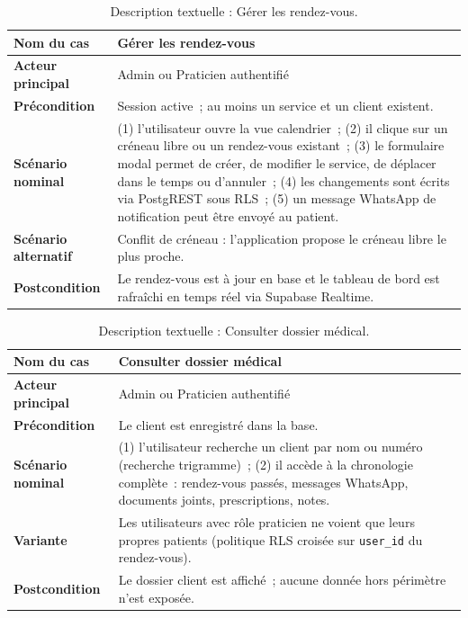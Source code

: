 \begin{table}[H]
  \centering\small
  \caption{Description textuelle : Gérer les rendez-vous.}
  \label{tab:uc-s2-rdv}
  \renewcommand{\arraystretch}{1.45}
  \begin{tabular}{|p{3.0cm}|>{\raggedright\arraybackslash}p{10.8cm}|}
    \hline\hline
    \textbf{Nom du cas} & Gérer les rendez-vous \\
    \hline
    \textbf{Acteur principal} & Admin ou Praticien authentifié \\
    \hline
    \textbf{Précondition} & Session active~; au moins un service et
      un client existent. \\
      \hline
    \textbf{Scénario nominal} &
      (1) l'utilisateur ouvre la vue calendrier~;
      (2) il clique sur un créneau libre ou un rendez-vous existant~;
      (3) le formulaire modal permet de créer, de modifier le
          service, de déplacer dans le temps ou d'annuler~;
      (4) les changements sont écrits via PostgREST sous RLS~;
      (5) un message WhatsApp de notification peut être envoyé au
          patient. \\
          \hline
    \textbf{Scénario alternatif} & Conflit de créneau : l'application
      propose le créneau libre le plus proche. \\
      \hline
    \textbf{Postcondition} & Le rendez-vous est à jour en base et
      le tableau de bord est rafraîchi en temps réel via Supabase
      Realtime. \\
    \hline\hline
  \end{tabular}
\end{table}

\begin{table}[H]
  \centering\small
  \caption{Description textuelle : Consulter dossier médical.}
  \label{tab:uc-s2-dossier}
  \renewcommand{\arraystretch}{1.45}
  \begin{tabular}{|p{3.0cm}|>{\raggedright\arraybackslash}p{10.8cm}|}
    \hline\hline
    \textbf{Nom du cas} & Consulter dossier médical \\
    \hline
    \textbf{Acteur principal} & Admin ou Praticien authentifié \\
    \hline
    \textbf{Précondition} & Le client est enregistré dans la base. \\
    \hline
    \textbf{Scénario nominal} &
      (1) l'utilisateur recherche un client par nom ou numéro
          (recherche trigramme)~;
      (2) il accède à la chronologie complète~: rendez-vous passés,
          messages WhatsApp, documents joints, prescriptions, notes. \\
          \hline
    \textbf{Variante} & Les utilisateurs avec rôle praticien ne
      voient que leurs propres patients (politique RLS croisée
      sur \texttt{user\_id} du rendez-vous). \\
      \hline
    \textbf{Postcondition} & Le dossier client est affiché~; aucune
      donnée hors périmètre n'est exposée. \\
    \hline\hline
  \end{tabular}
\end{table}

